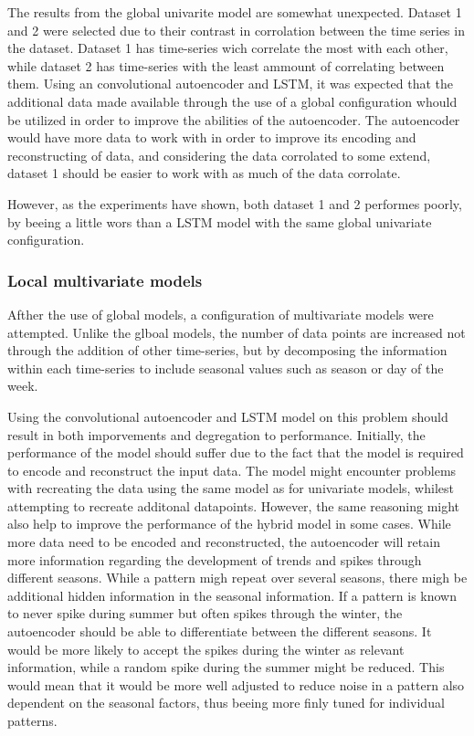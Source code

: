 The results from the global univarite model are somewhat unexpected.
Dataset 1 and 2 were selected due to their contrast in corrolation between the time series in the dataset.
Dataset 1 has time-series wich correlate the most with each other, while dataset 2 has time-series with the least ammount of correlating between them.
Using an convolutional autoencoder and LSTM, it was expected that the additional data made available through the use of a global configuration
whould be utilized in order to improve the abilities of the autoencoder.
The autoencoder would have more data to work with in order to improve its encoding and reconstructing of data,
and considering the data corrolated to some extend, dataset 1 should be easier to work with as much of the data corrolate.

However, as the experiments have shown, both dataset 1 and 2 performes poorly, by beeing a little wors than a LSTM model with the same
global univariate configuration.





\subsubsection{Local multivariate models}

Afther the use of global models, a configuration of multivariate models were attempted.
Unlike the glboal models,
the number of data points are increased not through the addition of other time-series,
but by decomposing the information within each time-series to include seasonal values such as season or day of the week.

Using the convolutional autoencoder and LSTM model on this problem should result in both imporvements and degregation to performance.
Initially, the performance of the model should suffer due to the fact that the model is required to encode and reconstruct the
input data.
The model might encounter problems with recreating the data using the same model as for univariate models,
whilest attempting to recreate additonal datapoints.
However, the same reasoning might also help to improve the performance of the hybrid model in some cases.
While more data need to be encoded and reconstructed, the autoencoder will retain more information
regarding the development of trends and spikes through different seasons.
While a pattern migh repeat over several seasons, there migh be additional hidden information in the seasonal information.
If a pattern is known to never spike during summer but often spikes through the winter,
the autoencoder should be able to differentiate between the different seasons.
It would be more likely to accept the spikes during the winter as relevant information, while a random spike during the summer might be reduced.
This would mean that it would be more well adjusted to reduce noise in a pattern also dependent on the seasonal factors,
thus beeing more finly tuned for individual patterns.

